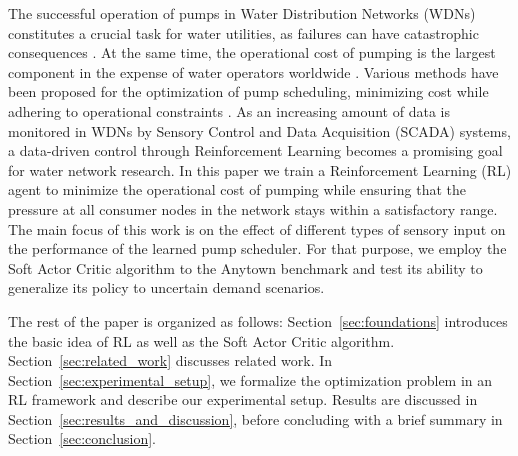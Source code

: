 The successful operation of pumps in Water Distribution Networks (WDNs) constitutes a crucial task for water utilities, as failures
can have catastrophic consequences \cite{mckee_review_2011}.
At the same time, the operational cost of pumping is the largest component in the expense of
water operators worldwide \cite{mala-jetmarova_lost_2017}. Various methods
have been proposed for the optimization of pump scheduling, minimizing cost
while adhering to operational constraints
\cite{baran_multi-objective_2005,ostfeld_ant_2008,reis_cost-efficient_2024}.
As an increasing amount of data is monitored in WDNs by Sensory Control and
Data Acquisition (SCADA) systems, a data-driven control through Reinforcement
Learning \cite{sutton_reinforcement_2018} becomes a promising goal for water
network research. In this paper we train a Reinforcement Learning (RL) agent
to minimize the operational cost of pumping while ensuring that the pressure
at all consumer nodes in the network stays within a satisfactory range.
The main focus of this work is on the effect of different types of
sensory input on the performance of the learned pump scheduler.
For that purpose, we employ the Soft Actor Critic algorithm \cite{haarnoja_soft_2018}
to the Anytown benchmark
\cite{walski_battle_1987} and test its ability to generalize its policy to uncertain demand scenarios.

The rest of the paper is organized as follows: Section~\ref{sec:foundations}
introduces the basic idea of RL as well as the Soft Actor Critic algorithm.
Section~\ref{sec:related_work} discusses related work. In Section~\ref{sec:experimental_setup}, we formalize the optimization problem in an RL
framework and describe our experimental setup. Results are discussed in
Section~\ref{sec:results_and_discussion}, before concluding with a brief
summary in Section~\ref{sec:conclusion}.